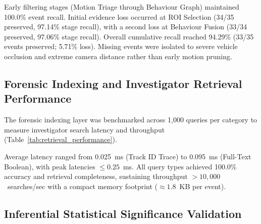 Early filtering stages (Motion Triage through Behaviour Graph) maintained 100.0\% event recall. Initial evidence loss occurred at ROI Selection (34/35 preserved, 97.14\% stage recall), with a second loss at Behaviour Fusion (33/34 preserved, 97.06\% stage recall). Overall cumulative recall reached 94.29\% (33/35 events preserved; 5.71\% loss). Missing events were isolated to severe vehicle occlusion and extreme camera distance rather than early motion pruning.

\subsection{Forensic Indexing and Investigator Retrieval Performance}

The forensic indexing layer was benchmarked across 1,000 queries per category to measure investigator search latency and throughput (Table~\ref{tab:retrieval_performance}).

\begin{table}[htbp]
\centering
\caption{Forensic indexing and investigator retrieval performance.}
\label{tab:retrieval_performance}
\scriptsize
{}
\end{table}

Average latency ranged from 0.025~ms (Track ID Trace) to 0.095~ms (Full-Text Boolean), with peak latencies $\le 0.25$~ms. All query types achieved 100.0\% accuracy and retrieval completeness, sustaining throughput $> 10{,}000$~searches/sec with a compact memory footprint ($\approx 1.8$~KB per event).

\subsection{Inferential Statistical Significance Validation}


